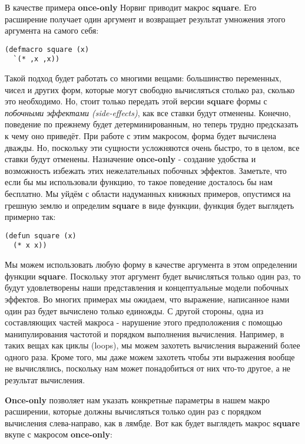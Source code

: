 В качестве примера \textbf{once-only} Норвиг приводит макрос \textbf{square}. Его расширение получает один аргумент и возвращает результат умножения этого аргумента на самого себя:

\begin{verbatim}
(defmacro square (x)
  `(* ,x ,x))
\end{verbatim}

Такой подход будет работать со многими вещами: большинство переменных, чисел и других форм, которые могут свободно вычисляться столько раз, сколько это необходимо. Но, стоит только передать этой версии \textbf{square} формы с \emph{побочными эффектами (side-effects)}, как все ставки будут отменены. Конечно, поведение по прежнему будет детерминированным, но теперь трудно предсказать к чему оно приведёт. При работе с этим макросом, форма будет вычислена дважды. Но, поскольку эти сущности усложняются очень быстро, то в целом, все ставки будут отменены. Назначение \textbf{once-only} - создание удобства и возможность избежать этих нежелательных побочных эффектов. Заметьте, что если бы мы использовали функцию, то такое поведение досталось бы нам бесплатно. Мы уйдём с области надуманных книжных примеров, опустимся на грешную землю и определим \textbf{square} в виде функции, функция будет выглядеть примерно так:

\begin{verbatim}
(defun square (x)
  (* x x))
\end{verbatim}

Мы можем использовать любую форму в качестве аргумента в этом определении функции \textbf{square}. Поскольку этот аргумент будет вычисляться только один раз, то будут удовлетворены наши представления и концептуальные модели побочных эффектов. Во многих примерах мы ожидаем, что выражение, написанное нами один раз будет вычислено только единожды. С другой стороны, одна из составляющих частей макроса - нарушение этого предположения с помощью манипулирования частотой и порядком выполнения вычисления. Например, в таких вещах как циклы (loops), мы можем захотеть вычисления выражений более одного раза. Кроме того, мы даже можем захотеть чтобы эти выражения вообще не вычислялись, поскольку нам может понадобиться от них что-то другое, а не результат вычисления.

\textbf{Once-only} позволяет нам указать конкретные параметры в нашем макро расширении, которые должны вычисляться только один раз с порядком вычисления слева-направо, как в лямбде. Вот как будет выглядеть макрос \textbf{square} вкупе с макросом \textbf{once-only}:


